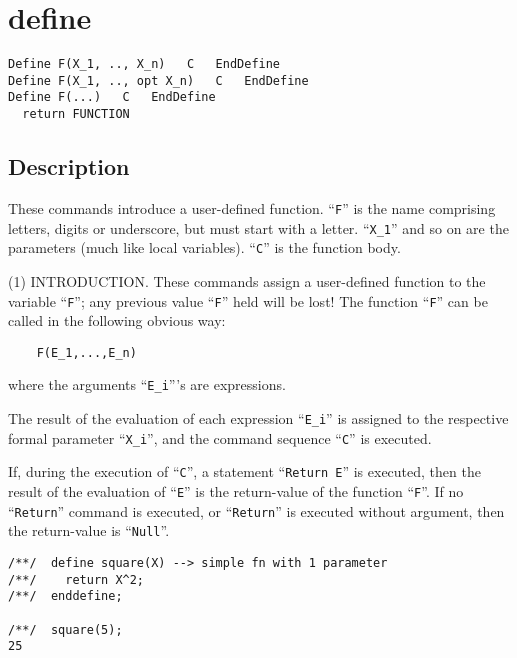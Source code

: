 \documentclass[a4paper]{mybook}
\newenvironment{command}{}{} %
\begin{document}
\section{define}
\label{define}
\begin{command} %


\begin{Verbatim}[label=syntax, rulecolor=\color{MidnightBlue},
frame=single]
Define F(X_1, .., X_n)   C   EndDefine
Define F(X_1, .., opt X_n)   C   EndDefine
Define F(...)   C   EndDefine
  return FUNCTION
\end{Verbatim}


\subsection*{Description}

These commands introduce a user-defined function.  ``\verb&F&'' is the name
comprising letters, digits or underscore, but must start with a letter.
``\verb&X_1&'' and so on are the parameters (much like local variables).
``\verb&C&'' is the function body.
\par 
(1) INTRODUCTION.
These commands assign a user-defined function to the variable ``\verb&F&'';
any previous value ``\verb&F&'' held will be lost!  The function ``\verb&F&'' can be
called in the following obvious way:
\begin{verbatim}
    F(E_1,...,E_n)
\end{verbatim}
where the arguments ``\verb&E_i&'''s are expressions.
\par 
The result of the evaluation of each expression ``\verb&E_i&'' is assigned
to the respective formal parameter ``\verb&X_i&'', and the command sequence
``\verb&C&'' is executed.
\par 
If, during the execution of ``\verb&C&'', a statement ``\verb&Return E&'' is executed,
then the result of the evaluation of ``\verb&E&'' is the return-value of the
function ``\verb&F&''.  If no ``\verb&Return&'' command is executed, or ``\verb&Return&'' is
executed without argument, then the return-value is ``\verb&Null&''.
\begin{Verbatim}[label=example, rulecolor=\color{PineGreen}, frame=single]
/**/  define square(X) --> simple fn with 1 parameter
/**/    return X^2;
/**/  enddefine;

/**/  square(5);
25
\end{Verbatim}



\end{command}
\end{document}
